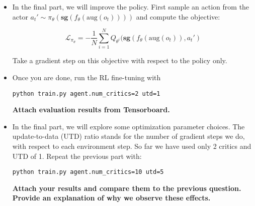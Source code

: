 \documentclass[12pt]{article}
\begin{document}
\begin{enumerate}
\begin{itemize}
    \item In the final part, we will improve the policy. First sample an action from the actor $a_t'\sim\pi_{\theta}(\textbf{sg}(f_{\theta}(\text{aug}(o_t))))$ and compute the objective:

    $$\mathcal{L}_{\pi_{\theta}} = -\frac{1}{N}\sum_{i=1}^NQ_{\theta^i}(\mathbf{sg}(f_{\theta}(\text{aug}(o_t)), a_t')$$

    Take a gradient step on this objective with respect to the policy only.
    


\item Once you are done, run the RL fine-tuning with

\begin{tcolorbox}[width=\linewidth, sharp corners=all, colback=white!95!black]
\begin{verbatim}
python train.py agent.num_critics=2 utd=1
\end{verbatim}
\end{tcolorbox}
\textbf{\color{red}Attach evaluation results from Tensorboard.}

\item In the final part, we will explore some optimization parameter choices. The update-to-data (UTD) ratio stands for the number of gradient steps we do, with respect to each environment step. So far we have used only 2 critics and UTD of 1. Repeat the previous part with:

\begin{tcolorbox}[width=\linewidth, sharp corners=all, colback=white!95!black]
\begin{verbatim}
python train.py agent.num_critics=10 utd=5
\end{verbatim}
\end{tcolorbox}

\textbf{\color{red}Attach your results and compare them to the previous question. Provide an explanation of why we observe these effects.}
\end{itemize}

\end{enumerate}
\end{document}
